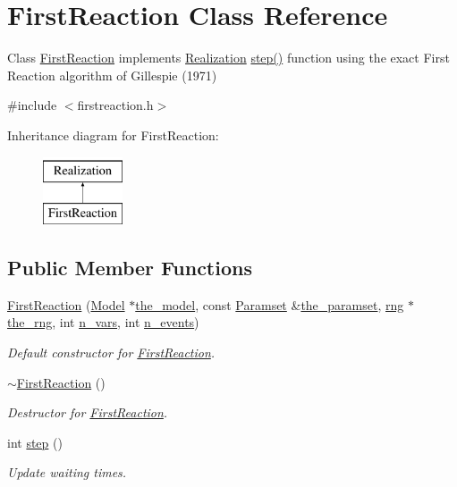 \hypertarget{class_first_reaction}{}\section{First\+Reaction Class Reference}
\label{class_first_reaction}


Class \hyperlink{class_first_reaction}{First\+Reaction} implements \hyperlink{class_realization}{Realization} \hyperlink{class_first_reaction_aed63c3c95d20b2ad557dabb6c5376a73}{step()} function using the exact First Reaction algorithm of Gillespie (1971)  




{\ttfamily \#include $<$firstreaction.\+h$>$}

Inheritance diagram for First\+Reaction\+:\begin{figure}[H]
\begin{center}
\leavevmode
\includegraphics[height=2.000000cm]{class_first_reaction}
\end{center}
\end{figure}
\subsection*{Public Member Functions}
\begin{DoxyCompactItemize}
\item 
\hyperlink{class_first_reaction_a5122d48f6ecbe17a75cecd41b06ac4a2}{First\+Reaction} (\hyperlink{class_model}{Model} $\ast$\hyperlink{class_realization_a47ec1d062b8caee874b08c1a17d6aeeb}{the\+\_\+model}, const \hyperlink{class_paramset}{Paramset} \&\hyperlink{class_realization_a119bb29de88929bc51bc1b329473a94b}{the\+\_\+paramset}, \hyperlink{classrng}{rng} $\ast$\hyperlink{class_realization_ac8d358d929afae90cf5790675b6744f9}{the\+\_\+rng}, int \hyperlink{class_realization_ad9951a0829e68e12fcb3817735bb5097}{n\+\_\+vars}, int \hyperlink{class_realization_afb711282bef806fc0020f91252d1df2c}{n\+\_\+events})
\begin{DoxyCompactList}\small\item\em Default constructor for \hyperlink{class_first_reaction}{First\+Reaction}. \end{DoxyCompactList}\item 
\hyperlink{class_first_reaction_ae2d082e400c86abd63ae8a30683c0469}{$\sim$\+First\+Reaction} ()
\begin{DoxyCompactList}\small\item\em Destructor for \hyperlink{class_first_reaction}{First\+Reaction}. \end{DoxyCompactList}\item 
int \hyperlink{class_first_reaction_aed63c3c95d20b2ad557dabb6c5376a73}{step} ()
\begin{DoxyCompactList}\small\item\em Update waiting times. \end{DoxyCompactList}\end{DoxyCompactItemize}
